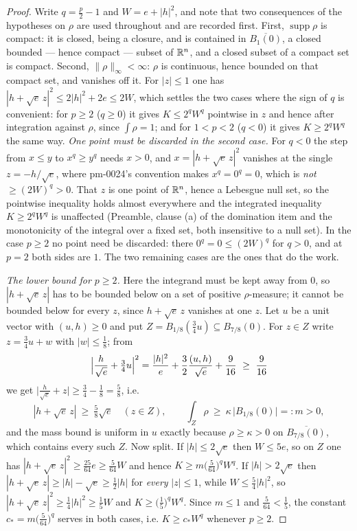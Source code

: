 \begin{proof}
Write $q=\tfrac p2-1$ and $W=e+|h|^2$, and note that two consequences of the
hypotheses on $\rho$ are used throughout and are recorded first.  First,
$\operatorname{supp}\rho$ is compact: it is closed, being a closure, and is
contained in $\overline{B_1(0)}$, a closed bounded --- hence compact --- subset
of $\mathbb{R}^n$, and a closed subset of a compact set is compact.  Second,
$\|\rho\|_\infty<\infty$: $\rho$ is continuous, hence bounded on that compact
set, and vanishes off it.  For
$|z|\le1$ one has $|h+\sqrt e\,z|^2\le2|h|^2+2e\le2W$, which settles the two
cases where the sign of $q$ is convenient: for $p\ge2$ ($q\ge0$) it gives
$K\le2^qW^q$ pointwise in $z$ and hence after integration against $\rho$, since
$\int\rho=1$; and for $1<p<2$ ($q<0$) it gives $K\ge2^qW^q$ the same way.
\emph{One point must be discarded in the second case.}  For $q<0$ the step from
$x\le y$ to $x^q\ge y^q$ needs $x>0$, and $x=|h+\sqrt e\,z|^2$ vanishes at the
single $z=-h/\sqrt e$, where pm-0024's convention makes $x^q=0^q=0$, which is
\emph{not} $\ge(2W)^q>0$.  That $z$ is one point of $\mathbb{R}^n$, hence a Lebesgue
null set, so the pointwise inequality holds almost everywhere and the integrated
inequality $K\ge2^qW^q$ is unaffected (Preamble, clause (a) of the domination
item and the monotonicity of the integral over a fixed set, both insensitive to
a null set).  In the case $p\ge2$ no point need be discarded: there
$0^q=0\le(2W)^q$ for $q>0$, and at $p=2$ both sides are $1$.  The two remaining
cases are the ones that do the work.

\emph{The lower bound for $p\ge2$.}  Here the integrand must be kept away from
$0$, so $|h+\sqrt e\,z|$ has to be bounded below on a set of positive
$\rho$-measure; it cannot be bounded below for every $z$, since $h+\sqrt e\,z$
vanishes at one $z$.  Let $u$ be a unit vector with $(u,h)\ge0$ and put
$Z=B_{1/8}(\tfrac34u)\subseteq B_{7/8}(0)$.  For $z\in Z$ write $z=\tfrac34u+w$
with $|w|\le\tfrac18$; from
\[
\Bigl|\frac h{\sqrt e}+\tfrac34u\Bigr|^2
=\frac{|h|^2}e+\frac32\frac{(u,h)}{\sqrt e}+\frac9{16}\ \ge\ \frac9{16}
\]
we get $\bigl|\tfrac h{\sqrt e}+z\bigr|\ge\tfrac34-\tfrac18=\tfrac58$, i.e.
\[
|h+\sqrt e\,z|\ \ge\ \tfrac58\sqrt e\quad(z\in Z),
\qquad
\int_Z\rho\ \ge\ \kappa\,\bigl|B_{1/8}(0)\bigr|=:m>0 ,
\]
and the mass bound is uniform in $u$ exactly because $\rho\ge\kappa>0$ on
$\overline{B_{7/8}(0)}$, which contains every such $Z$.  Now split.  If
$|h|\le2\sqrt e$ then $W\le5e$, so on $Z$ one has
$|h+\sqrt e\,z|^2\ge\tfrac{25}{64}e\ge\tfrac5{64}W$ and hence
$K\ge m\bigl(\tfrac5{64}\bigr)^qW^q$.  If $|h|>2\sqrt e$ then
$|h+\sqrt e\,z|\ge|h|-\sqrt e\ge\tfrac12|h|$ for \emph{every} $|z|\le1$, while
$W\le\tfrac54|h|^2$, so $|h+\sqrt e\,z|^2\ge\tfrac14|h|^2\ge\tfrac15W$ and
$K\ge\bigl(\tfrac15\bigr)^qW^q$.  Since $m\le1$ and $\tfrac5{64}<\tfrac15$, the
constant $c_\ast=m\bigl(\tfrac5{64}\bigr)^q$ serves in both cases, i.e.
$K\ge c_\ast W^q$ whenever $p\ge2$.


\end{proof}
